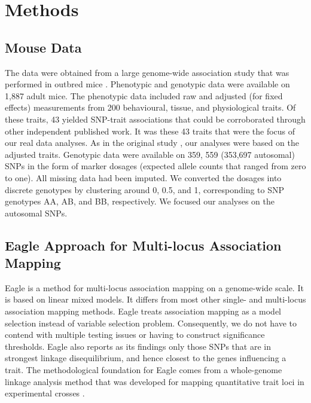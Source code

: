 \documentclass{nature}
\begin{document}
\section{Methods}


\subsection{Mouse Data}

The data were obtained from a large genome-wide association study that was performed in outbred mice \cite{nicod2016genome}. 
Phenotypic and genotypic data were available on 1,887 adult mice. 
The phenotypic data included raw and adjusted (for fixed effects) measurements from 200 behavioural, tissue, and physiological traits.  
Of these traits, 
43 yielded SNP-trait associations that could be corroborated through other independent published work. It was these 
43 traits that were the focus of our real data analyses. As in the original study  \cite{nicod2016genome}, our analyses 
were based on the adjusted traits.
Genotypic data were available on 359, 559 (353,697 autosomal) SNPs in the 
form of marker dosages (expected allele counts that ranged from zero to one). All missing data had been imputed. 
We converted the dosages into discrete genotypes 
by clustering around 0, 0.5, and 1, corresponding to SNP genotypes AA, AB, and BB, respectively. 
We focused our analyses on the autosomal SNPs.




\subsection{Eagle Approach for Multi-locus Association Mapping}

Eagle is a method for multi-locus association mapping on a genome-wide scale. It is based on linear mixed models. It differs from most other single- and multi-locus association mapping methods. Eagle treats association mapping as a model selection instead of variable selection problem. Consequently,  we do not have to contend with multiple testing issues or having to construct significance thresholds.  
Eagle also 
reports as its findings only those SNPs that are in strongest linkage disequilibrium, and hence closest to the genes influencing a trait. 
The methodological foundation for Eagle comes from a whole-genome linkage analysis method that was developed for mapping 
quantitative trait loci in experimental crosses \cite{verbyla2007analysis}.
\end{document}
